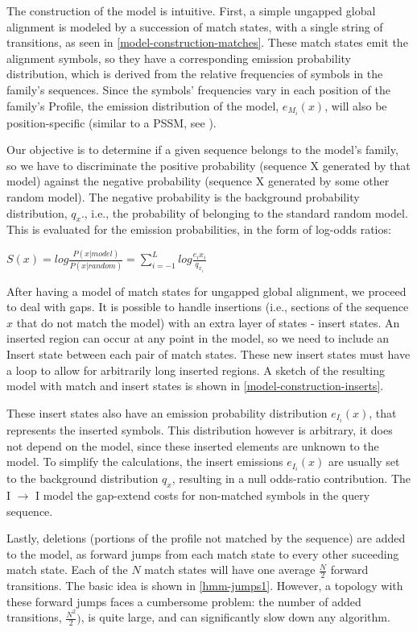 The construction of the model is intuitive. First, a simple ungapped global alignment is modeled by a succession of match states, with a single string of transitions, as seen in \autoref{model-construction-matches}. These match states emit the alignment symbols, so they have a corresponding emission probability distribution, which is derived from the relative frequencies of symbols in the family's sequences. Since the symbols' frequencies vary in each position of the family's Profile, the emission distribution of the model, $e_{M_i}(x)$, will also be position-specific (similar to a \ac{PSSM}, see ).

Our objective is to determine if a given sequence belongs to the model's family, so we have to discriminate the positive probability (sequence X generated by that model) against the negative probability (sequence X generated by some other random model). The negative probability is the background probability distribution, ${q_x}$., i.e., the probability of belonging to the standard random model. This is evaluated for the emission probabilities, in the form of log-odds ratios:

$ S(x) = log \frac{P(x|model)} {P(x|random)} = \sum\limits_{i=-1}^L log \frac{e_i{x_i}} {q_{x_i}} $

After having a model of match states for ungapped global alignment, we proceed to deal with gaps. It is possible to handle insertions (i.e., sections of the sequence $x$ that do not match the model) with an extra layer of states - insert states. An inserted region can occur at any point in the model, so we need to include an Insert state between each pair of match states. These new insert states must have a loop to allow for arbitrarily long inserted regions. A sketch of the resulting model with match and insert states is shown in \autoref{model-construction-inserts}.

These insert states also have an emission probability distribution $e_{I_i}(x)$, that represents the inserted symbols. This distribution however is arbitrary, it does not depend on the model, since these inserted elements are unknown to the model. To simplify the calculations, the insert emissions $e_{I_i}(x)$ are usually set to the background distribution ${q_x}$, resulting in a null odds-ratio contribution. The I $\rightarrow$ I model the gap-extend costs for non-matched symbols in the query sequence.

Lastly, deletions (portions of the profile not matched by the sequence) are added to the model, as forward jumps from each match state to every other suceeding match state. Each of the $N$ match states will have one average $\frac{N}{2}$ forward transitions. The basic idea is shown in \autoref{hmm-jumps1}. However, a topology with these forward jumps faces a cumbersome problem: the number of added transitions, $\frac{N^2}{2})$, is quite large, and can significantly slow down any algorithm. 

